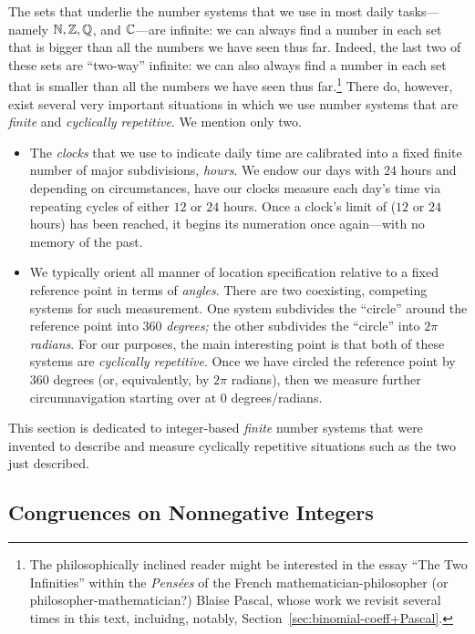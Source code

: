 The sets that underlie the number systems that we use in most daily tasks---namely $\mathbb{N}, \mathbb{Z}, \mathbb{Q}$, and $\mathbb{C}$---are infinite: we can always find a number in each set that is bigger than all the numbers we have seen thus far.  Indeed, the last two of these sets are ``two-way'' infinite: we can also always find a number in each set that is smaller than all the numbers we have seen thus
far.\footnote{\label{foot:Pascal}The philosophically inclined reader might be interested in the essay ``The Two Infinities'' within the {\it Pens\'{e}es} of the French mathematician-philosopher (or
philosopher-mathematician?) Blaise Pascal, whose work we revisit several times in this text, incluidng, notably, Section~\ref{sec:binomial-coeff+Pascal}.} There do, however, exist several very important situations in which we use number systems that are {\em finite} and {\em cyclically repetitive}.  We mention only two.
\begin{itemize}
\item
The {\em clocks} that we use to indicate daily time are calibrated into a fixed finite number of major subdivisions, {\em hours}.  We endow our days with $24$ hours and depending on circumstances, have our clocks measure each day's time via repeating cycles of either $12$ or $24$ hours.  Once a clock's limit of ($12$ or $24$ hours) has been reached, it begins its numeration once again---with no memory of the past.

\item
We typically orient all manner of location specification relative to a fixed reference point in terms of {\em angles}.  There are two coexisting, competing systems for such measurement.  One system
subdivides the ``circle'' around the reference point into $360$ {\em degrees;} the other subdivides the ``circle'' into $2 \pi$ {\em radians}.  For our purposes, the main interesting point is that both of these systems are {\em cyclically repetitive}.  Once we have circled the reference point by $360$ degrees (or, equivalently, by $2 \pi$ radians), then we measure further circumnavigation starting over at $0$ degrees/radians.
\end{itemize}

This section is dedicated to integer-based {\em finite} number systems that were invented to describe and measure cyclically repetitive situations such as the two just described.

\subsection{Congruences on Nonnegative Integers}
\label{sec:congruences}

